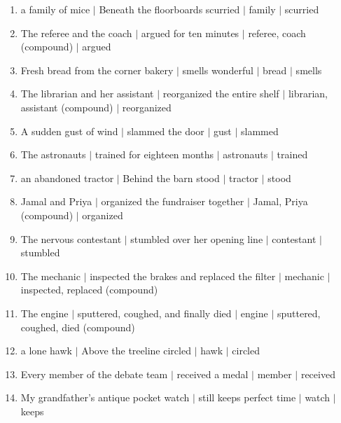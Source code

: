 \documentclass[11pt]{article}
\begin{document}
\begin{enumerate}
  \item a family of mice $\mid$ Beneath the floorboards scurried $\mid$ family $\mid$ scurried
  \item The referee and the coach $\mid$ argued for ten minutes $\mid$ referee, coach (compound) $\mid$ argued
  \item Fresh bread from the corner bakery $\mid$ smells wonderful $\mid$ bread $\mid$ smells
  \item The librarian and her assistant $\mid$ reorganized the entire shelf $\mid$ librarian, assistant (compound) $\mid$ reorganized
  \item A sudden gust of wind $\mid$ slammed the door $\mid$ gust $\mid$ slammed
  \item The astronauts $\mid$ trained for eighteen months $\mid$ astronauts $\mid$ trained
  \item an abandoned tractor $\mid$ Behind the barn stood $\mid$ tractor $\mid$ stood
  \item Jamal and Priya $\mid$ organized the fundraiser together $\mid$ Jamal, Priya (compound) $\mid$ organized
  \item The nervous contestant $\mid$ stumbled over her opening line $\mid$ contestant $\mid$ stumbled
  \item The mechanic $\mid$ inspected the brakes and replaced the filter $\mid$ mechanic $\mid$ inspected, replaced (compound)
  \item The engine $\mid$ sputtered, coughed, and finally died $\mid$ engine $\mid$ sputtered, coughed, died (compound)
  \item a lone hawk $\mid$ Above the treeline circled $\mid$ hawk $\mid$ circled
  \item Every member of the debate team $\mid$ received a medal $\mid$ member $\mid$ received
  \item My grandfather's antique pocket watch $\mid$ still keeps perfect time $\mid$ watch $\mid$ keeps
\end{enumerate}
\end{document}
